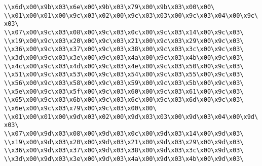 \verb|\\x6d\x00\x9b\x03\x6e\x00\x9b\x03\x79\x00\x9b\x03\x00\x00\|\newline
\verb|\\x01\x00\x01\x00\x9c\x03\x02\x00\x9c\x03\x03\x00\x9c\x03\x04\x00\x9c\x03\|\newline
\verb|\\x07\x00\x9c\x03\x08\x00\x9c\x03\x0c\x00\x9c\x03\x14\x00\x9c\x03\|\newline
\verb|\\x19\x00\x9c\x03\x20\x00\x9c\x03\x21\x00\x9c\x03\x29\x00\x9c\x03\|\newline
\verb|\\x36\x00\x9c\x03\x37\x00\x9c\x03\x38\x00\x9c\x03\x3c\x00\x9c\x03\|\newline
\verb|\\x3d\x00\x9c\x03\x3e\x00\x9c\x03\x4a\x00\x9c\x03\x4b\x00\x9c\x03\|\newline
\verb|\\x4c\x00\x9c\x03\x4d\x00\x9c\x03\x4e\x00\x9c\x03\x50\x00\x9c\x03\|\newline
\verb|\\x51\x00\x9c\x03\x53\x00\x9c\x03\x54\x00\x9c\x03\x55\x00\x9c\x03\|\newline
\verb|\\x56\x00\x9c\x03\x58\x00\x9c\x03\x59\x00\x9c\x03\x5b\x00\x9c\x03\|\newline
\verb|\\x5e\x00\x9c\x03\x5f\x00\x9c\x03\x60\x00\x9c\x03\x61\x00\x9c\x03\|\newline
\verb|\\x65\x00\x9c\x03\x6b\x00\x9c\x03\x6c\x00\x9c\x03\x6d\x00\x9c\x03\|\newline
\verb|\\x6e\x00\x9c\x03\x79\x00\x9c\x03\x00\x00\|\newline
\verb|\\x01\x00\x01\x00\x9d\x03\x02\x00\x9d\x03\x03\x00\x9d\x03\x04\x00\x9d\x03\|\newline
\verb|\\x07\x00\x9d\x03\x08\x00\x9d\x03\x0c\x00\x9d\x03\x14\x00\x9d\x03\|\newline
\verb|\\x19\x00\x9d\x03\x20\x00\x9d\x03\x21\x00\x9d\x03\x29\x00\x9d\x03\|\newline
\verb|\\x36\x00\x9d\x03\x37\x00\x9d\x03\x38\x00\x9d\x03\x3c\x00\x9d\x03\|\newline
\verb|\\x3d\x00\x9d\x03\x3e\x00\x9d\x03\x4a\x00\x9d\x03\x4b\x00\x9d\x03\|\newline
